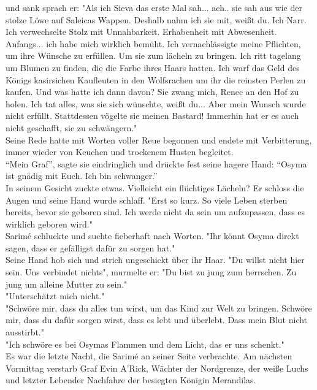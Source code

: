 und sank sprach er: "Als ich Sieva das erste Mal sah... ach.. sie sah aus wie der stolze Löwe auf 
Saleicas Wappen. Deshalb nahm ich sie mit, weißt du. Ich Narr. Ich verwechselte Stolz mit 
Unnahbarkeit. Erhabenheit mit Abwesenheit. Anfangs... ich habe mich wirklich bemüht. Ich 
vernachlässigte meine Pflichten, um ihre Wünsche zu erfüllen. Um sie zum lächeln zu bringen. Ich 
ritt tagelang um Blumen zu finden, die die Farbe ihres Haars hatten. Ich warf das Geld des Königs 
kasirsichen Kaufleuten in den Wolfsrachen um ihr die reinsten Perlen zu kaufen. 
Und was hatte ich dann davon? Sie zwang mich, Renec an den Hof zu holen. Ich tat alles, was sie sich 
wünschte, weißt du... Aber mein Wunsch wurde nicht erfüllt. Stattdessen vögelte sie meinen Bastard! 
Immerhin hat er es auch nicht geschafft, sie zu schwängern."\\
Seine Rede hatte mit Worten voller Reue begonnen und endete mit Verbitterung, immer wieder von 
Keuchen und trockenem Husten begleitet.\\
``Mein Graf'', sagte sie eindringlich und drückte fest seine hagere Hand: ``Osyma ist gnädig mit 
Euch. Ich bin schwanger.''\\
In seinem Gesicht zuckte etwas. Vielleicht ein flüchtiges Lächeln? Er schloss die Augen und seine 
Hand wurde schlaff. "Erst so kurz. So viele Leben sterben bereits, bevor sie geboren sind. Ich 
werde nicht da sein um aufzupassen, dass es wirklich geboren wird."\\
Sarimé schluckte und suchte fieberhaft nach Worten. "Ihr könnt Osyma direkt sagen, dass er 
gefälligst dafür zu sorgen hat."\\
Seine Hand hob sich und strich ungeschickt über ihr Haar. "Du willst nicht hier sein. Uns verbindet 
nichts", murmelte er: "Du bist zu jung zum herrschen. Zu jung um alleine Mutter zu sein."\\
"Unterschätzt mich nicht."\\
"Schwöre mir, dass du alles tun wirst, um das Kind zur Welt zu bringen. Schwöre mir, dass du dafür 
sorgen wirst, dass es lebt und überlebt. Dass mein Blut nicht ausstirbt."\\
"Ich schwöre es bei Osymas Flammen und dem Licht, das er uns schenkt."\\
Es war die letzte Nacht, die Sarimé an seiner Seite verbrachte. Am nächsten Vormittag verstarb Graf 
Evin A’Rick, Wächter der Nordgrenze, der weiße Luchs und letzter Lebender Nachfahre der besiegten 
Königin Merandilas.\\



